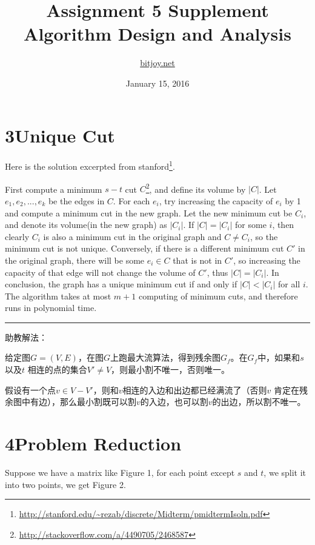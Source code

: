 \documentclass[a4paper,12pt]{article}
\title{Assignment 5 Supplement\\Algorithm Design and Analysis}
\author{\href{http://bitjoy.net}{bitjoy.net}}
\date{January 15, 2016}
\begin{document}
\maketitle

\section*{3\quad Unique Cut}
Here is the solution excerpted from stanford\footnote{\url{http://stanford.edu/~rezab/discrete/Midterm/pmidtermIsoln.pdf}}.

First compute a minimum $s-t$ cut $C$\footnote{\url{http://stackoverflow.com/a/4490705/2468587}}, and define its volume by $|C|$. Let $e_1,e_2,...,e_k$ be the edges in $C$. For each $e_i$, try increasing the capacity of $e_i$ by 1 and compute a minimum cut in the new graph. Let the new minimum cut be $C_i$, and denote its volume(in the new graph) as $|C_i|$. If $|C|=|C_i|$ for some $i$, then clearly $C_i$ is also a minimum cut in the original graph and $C\neq C_i$, so the minimum cut is not unique. Conversely, if there is a different minimum cut $C'$ in the original graph, there will be some $e_i\in C$ that is not in $C'$, so increasing the capacity of that edge will not change the volume of $C'$, thus $|C|=|C_i|$. In conclusion, the graph has a unique minimum cut if and only if $|C|<|C_i|$ for all $i$. The algorithm takes at most $m+1$ computing of minimum cuts, and therefore runs in polynomial time.

\rule{\textwidth}{1pt}

助教解法：

给定图$G=(V,E)$，在图$G$上跑最大流算法，得到残余图$G_f$。在$G_f$中，如果和$s$ 以及$t$ 相连的点的集合$V'\neq V$，则最小割不唯一，否则唯一。

假设有一个点$v\in V-V'$，则和$v$相连的入边和出边都已经满流了（否则$v$ 肯定在残余图中有边），那么最小割既可以割$v$的入边，也可以割$v$的出边，所以割不唯一。
\section*{4\quad Problem Reduction}

Suppose we have a matrix like Figure 1, for each point except $s$ and $t$, we split it into two points, we get Figure 2.
\end{document}
